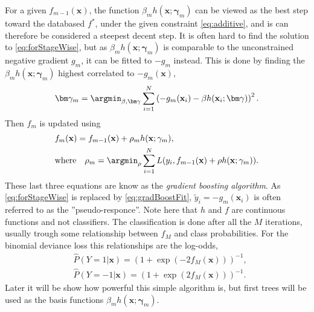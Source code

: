 For a given $f_{m-1}(\mathbf{x})$, the function $\beta_m h(\mathbf{x}; \mathbf{\gamma}_m)$ can be viewed as the best step toward the databased $f^*$, under the given constraint \eqref{eq:additive}, and is can therefore be considered a steepest decent step. It is often hard to find the solution to \eqref{eq:forStageWise}, but as $\beta_m h(\mathbf{x}; \mathbf{\gamma}_m)$ is comparable to the unconstrained negative gradient $g_m$, it can be fitted to $-g_m$ instead. This is done by finding the $\beta_m h(\mathbf{x}; \mathbf{\gamma}_m)$ highest correlated to $-g_m(\mathbf{x})$,
\begin{align}
  \label{eq:gradBoostFit} 
  \bm \gamma_m = \argmin_{\beta, \bm \gamma} \sum^{N}_{i=1} \left( -g_m(\mathbf{x}_i) - \beta h(\mathbf{x}_i; \bm \gamma) \right)^2.
\end{align}
Then $f_m$ is updated using
\begin{align}
  &f_m(\mathbf{x}) = f_{m-1}(\mathbf{x}) + \rho_m h(\mathbf{x}; \mathbf{\gamma}_{m}),\\
  \label{eq:lineSearch} 
  &\text{where} \quad \rho_m = \argmin_\rho \sum^{N}_{i=1} L(y_i, f_{m-1}(\mathbf{x}) + \rho h(\mathbf{x}; \mathbf{\gamma}_m)).
\end{align}
These last three equations are know as the \textit{gradient boosting algorithm}.
As \eqref{eq:forStageWise} is replaced by \eqref{eq:gradBoostFit}, $\tilde{y}_i = -g_m(\mathbf{x}_i)$ is often referred to as the ''pseudo-responce''. 
Note here that $h$ and $f$ are continuous functions and not classifiers. The classification is done after all the $M$ iterations, usually trough some relationship between $f_M$ and class probabilities. For the binomial deviance loss this relationships are the log-odds,
\begin{align}
  \label{eq:boostLogOdds1} 
  &\hat P(Y = 1 |  \mathbf{x}) = \left( 1+ \exp\left( -2 f_M (\mathbf{x}) \right) \right)^{-1},\\
  \label{eq:boostLogOdds2} 
  &\hat P(Y = -1 |  \mathbf{x}) = \left( 1+ \exp\left( 2 f_M (\mathbf{x}) \right) \right)^{-1}.
\end{align}
Later it will be show how powerful this simple algorithm is, but first trees will be used as the basis functions $\beta_m h(\mathbf{x}; \mathbf{\gamma}_m)$.

